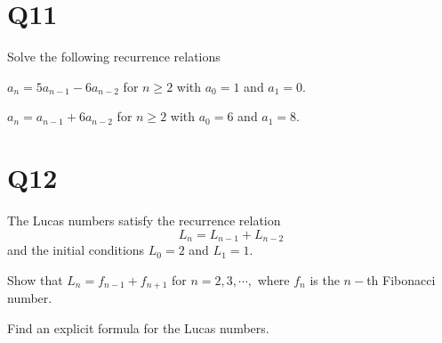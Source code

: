 \documentclass[a4paper,11pt]{article}
\begin{document}
\section*{Q11}
Solve the following recurrence relations
\begin{qparts}
    
    \item $a_n=5a_{n-1}-6a_{n-2}$ for $n\ge 2$ with $a_0=1$ and $a_1=0$.
    \item $a_n=a_{n-1}+6a_{n-2}$ for $n\ge 2$ with $a_0=6$ and $a_1=8$.
    
\end{qparts}

\section*{Q12}

The Lucas numbers satisfy the recurrence relation
\[L_n = L_{n-1} + L_{n-2}\]
and the initial conditions $L_0 = 2$ and $L_1 = 1.$
\begin{qparts}
\item Show that $L_n = f_{n-1} + f_{n+1}$ for $n = 2, 3, \cdots ,$
where $f_n$ is the $n-$th Fibonacci number.

\item Find an explicit formula for the Lucas numbers.
\end{qparts}
\end{document}
